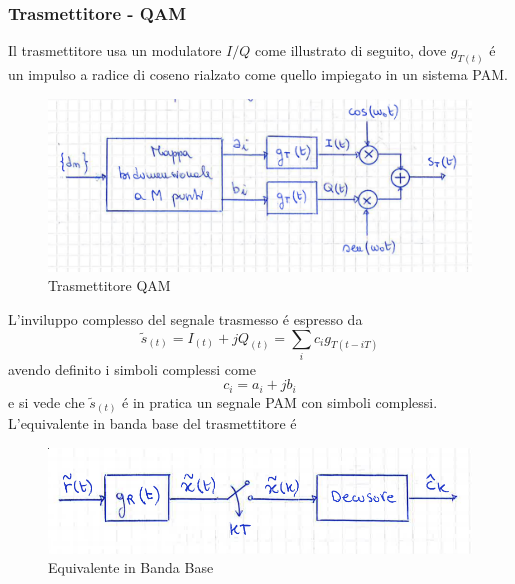         \subsubsection{Trasmettitore - QAM}
            Il trasmettitore usa un modulatore $I/Q$ come illustrato di seguito, dove $g_{T(t)}$ é un impulso a radice di coseno rialzato 
            come quello impiegato in un sistema PAM.
            \begin{figure}[H]
                \centering
                \includegraphics[width = 12cm]{media/trasmettitore qam.png}
                \caption{Trasmettitore QAM}
            \end{figure}
            L'inviluppo complesso del segnale trasmesso é espresso da
            \[
                \tilde{s}_{(t)} = I_{(t)} +jQ_{(t)} = \sum_{i}c_ig_{T(t-iT)}
            \]
            avendo definito i simboli complessi come 
            \[
                c_i = a_i+jb_i    
            \]
            e si vede che $\tilde{s}_{(t)}$ é in pratica un segnale PAM con simboli complessi. L'equivalente in banda base del trasmettitore é 
            \begin{figure}[H]
                \centering
                \includegraphics[width = 12cm]{media/equivalente ricevitore in banda base.png}
                \caption{Equivalente in Banda Base}
            \end{figure}
